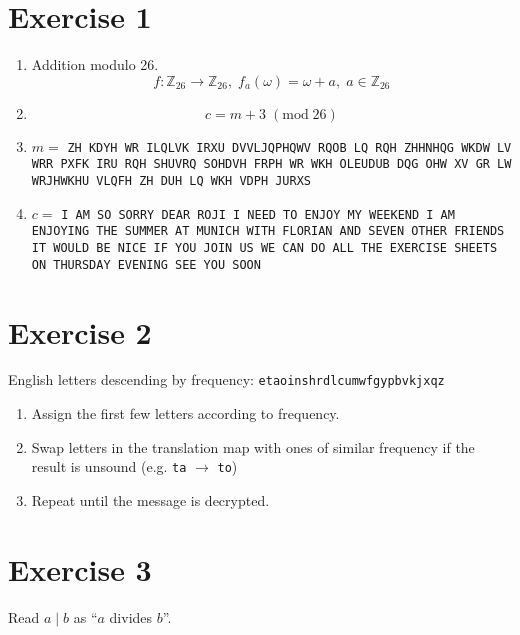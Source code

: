 \documentclass[a4paper]{scrreprt}
\newcommand\Z{\mathbb Z}
\begin{document}
\section*{Exercise 1}

\begin{enumerate}[label=\alph*)]
    \item Addition modulo 26.
        \[f:\Z_{26}\rightarrow\Z_{26},\;f_a(\omega)=\omega+a,\;a\in\Z_{26}\]
    \item\[c = m+3\; (\mathrm{mod}\; 26)\]
    \item \begin{flushleft}
            $m=$ \texttt{ZH KDYH WR ILQLVK IRXU DVVLJQPHQWV RQOB LQ RQH ZHHNHQG WKDW LV
WRR PXFK IRU RQH SHUVRQ SOHDVH FRPH WR WKH OLEUDUB DQG OHW XV GR
        LW WRJHWKHU VLQFH ZH DUH LQ WKH VDPH JURXS}
    \end{flushleft}
    \item \begin{flushleft}
        $c=$ \texttt{I AM SO SORRY DEAR ROJI I NEED TO ENJOY MY WEEKEND I AM ENJOYING THE
        SUMMER AT MUNICH WITH FLORIAN AND SEVEN OTHER FRIENDS IT WOULD BE NICE IF YOU JOIN
        US WE CAN DO ALL THE EXERCISE SHEETS ON THURSDAY EVENING SEE YOU SOON}
    \end{flushleft}
\end{enumerate}

\section*{Exercise 2}

English letters descending by frequency: \texttt{etaoinshrdlcumwfgypbvkjxqz}

\begin{enumerate}
    \item Assign the first few letters according to frequency.
    \item Swap letters in the translation map with ones of similar frequency if the result
        is unsound (e.g. \texttt{ta} $\rightarrow$ \texttt{to})
    \item Repeat until the message is decrypted.
\end{enumerate}

\section*{Exercise 3}

Read $a\mid b$ as ``$a$ divides $b$''.
\end{document}
